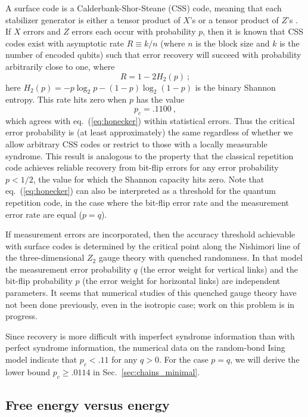 A surface code is a Calderbank-Shor-Steane (CSS) code, meaning that each stabilizer generator is either a tensor product of $X$'s or a tensor product of $Z$'s \cite{cal_shor,steane_css}. If $X$ errors and $Z$ errors each occur with probability $p$, then it is known that CSS codes exist with asymptotic rate $R\equiv k/n$ (where $n$ is the block size and $k$ is the number of encoded qubits) such that error recovery will succeed with probability arbitrarily close to one, where  
\begin{equation}
R = 1 - 2H_2(p)~;\end{equation}
here $H_2(p)= -p\log_2 p -(1-p)\log_2(1-p)$ is the binary Shannon entropy. This rate hits zero when $p$ has the value
\begin{equation}
p_c = .1100 ~,
\end{equation}
which agrees with eq.~(\ref{eq:honecker}) within statistical errors. Thus the critical error probability is (at least approximately) the same regardless of whether we allow arbitrary CSS codes or restrict to those with a locally measurable syndrome. This result is analogous to the property that the classical repetition code achieves reliable recovery from bit-flip errors for any error probability $p<1/2$, the value for which the Shannon capacity hits zero.
Note that eq.~(\ref{eq:honecker}) can also be interpreted as a threshold for the quantum repetition code, in the case where the bit-flip error rate and the measurement error rate are equal ($p=q$).

If measurement errors are incorporated, then the accuracy threshold achievable with surface codes is determined by the critical point along the Nishimori line of the three-dimensional $Z_2$ gauge theory with quenched randomness. In that model the
measurement error probability $q$ (the error weight for vertical links)
and the bit-flip probability $p$ (the error weight for horizontal links)
are independent parameters.  It seems that numerical studies of this quenched gauge theory have not been done previously, even in the isotropic case; work on this problem is in progress. 

Since recovery is more difficult with imperfect syndrome information than with perfect syndrome information, the numerical data on the random-bond Ising model indicate that $p_c < .11$ for any $q>0$. For the case $p=q$, we will derive the lower bound $p_c\ge .0114$ in Sec.~\ref{sec:chains_minimal}.

\subsection{Free energy versus energy}
\label{free_energy_energy}

